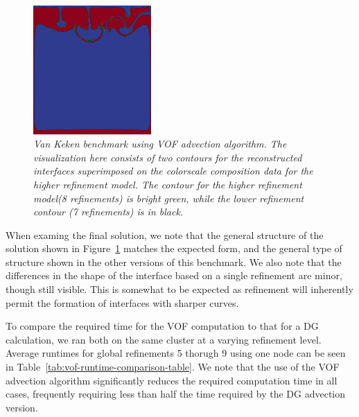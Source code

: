 \documentclass{article}
\begin{document}
\begin{figure}
    \centering
    \includegraphics[width=0.4\textwidth]{cookbooks/benchmarks/vof-van-keken/vof_van_keken_refinement_comparison.png}
    \caption{\it Van Keken benchmark using VOF advection algorithm. The
        visualization here consists of two contours for the reconstructed
        interfaces superimposed on the colorscale composition data for the
        higher refinement model. The contour for the higher refinement model(8
        refinements) is bright green, while the lower refinement contour (7
    refinements) is in black.}
    \label{fig:vof-vk-2}
\end{figure}

When examing the final solution, we note that the general structure of the
solution shown in Figure~\ref{fig:vof-vk-2} matches the expected form, and the
general type of structure shown in the other versions of this benchmark.
We also note that the differences in the shape of the interface based on a
single refinement are minor, though still visible.
This is somewhat to be expected as refinement will inherently permit the
formation of interfaces with sharper curves.

To compare the required time for the VOF computation to that for a DG
calculation, we ran both on the same cluster at a varying refinement level.
Average runtimes for global refinements 5 thorugh 9 using one node can be seen
in Table~\ref{tab:vof-runtime-comparison-table}.
We note that the use of the VOF advection algorithm significantly reduces the
required computation time in all cases, frequently requiring less than half the
time required by the DG advection version.
\end{document}
